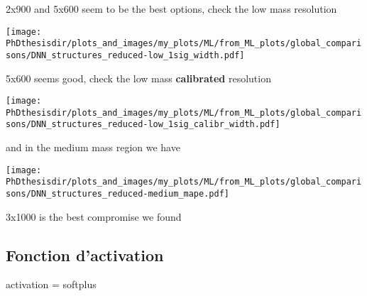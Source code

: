 2x900 and 5x600 seem to be the best options, check the low mass resolution

\texttt{[image: \\PhDthesisdir/plots\_and\_images/my\_plots/ML/from\_ML\_plots/global\_comparisons/DNN\_structures\_reduced-low\_1sig\_width.pdf]}

5x600 seems good, check the low mass \textbf{calibrated} resolution

\texttt{[image: \\PhDthesisdir/plots\_and\_images/my\_plots/ML/from\_ML\_plots/global\_comparisons/DNN\_structures\_reduced-low\_1sig\_calibr\_width.pdf]}

and in the medium mass region we have

\texttt{[image: \\PhDthesisdir/plots\_and\_images/my\_plots/ML/from\_ML\_plots/global\_comparisons/DNN\_structures\_reduced-medium\_mape.pdf]}

3x1000 is the best compromise we found

\subsection{Fonction d'activation}

activation = softplus

